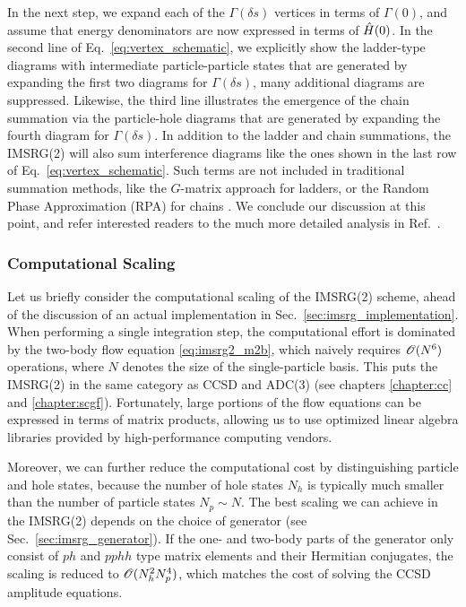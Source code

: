 {In the next step, we expand each of the $\Gamma(\delta s)$ vertices in
terms of $\Gamma(0)$, and assume that energy denominators are now
expressed in terms of $\hat{H}(0)$. In the second line of Eq.~\eqref{eq:vertex_schematic},
we explicitly show the ladder-type diagrams with intermediate 
particle-particle states that are generated by expanding
the first two diagrams for $\Gamma(\delta s)$, many additional diagrams
are suppressed. Likewise, the third line illustrates the emergence of 
the chain summation via the particle-hole diagrams that 
are generated by expanding the fourth diagram for $\Gamma(\delta s)$.
In addition to the ladder and chain summations, the IMSRG(2) will also
sum interference diagrams like the ones shown in the last row of 
Eq.~\eqref{eq:vertex_schematic}.
Such terms are not included in traditional summation methods, like
the $G$-matrix approach for ladders, or the Random Phase Approximation
(RPA) for chains \cite{Day:1967zl,Brandow:1967tg,Fetter:2003ve}. We
conclude our discussion at this point, and refer interested readers
to the much more detailed analysis in Ref.~\cite{Hergert:2016jk}.

%
%
\subsubsection{Computational Scaling}
Let us briefly consider the computational scaling of the IMSRG(2) scheme,
ahead of the discussion of an actual implementation in Sec.~\ref{sec:imsrg_implementation}.
When performing a single integration step, the computational effort is 
dominated by the two-body flow equation \eqref{eq:imsrg2_m2b}, which 
naively requires $\mathcal{O}(N^6)$ operations, where $N$ denotes the size of
the single-particle basis. This puts the IMSRG(2) in the same category 
as CCSD and ADC(3) (see chapters \ref{chapter:cc} and \ref{chapter:scgf}).
Fortunately, large portions of the flow equations can be expressed in 
terms of matrix products, allowing us to use optimized linear algebra 
libraries provided by high-performance computing vendors. 

Moreover, we can further reduce the computational cost by distinguishing 
particle and hole states, because the number of hole states $N_h$ is 
typically much smaller than the number of particle states $N_p\sim N$. 
The best scaling we can achieve in the IMSRG(2) depends on the choice of 
generator (see Sec.~\ref{sec:imsrg_generator}). If the one- and two-body 
parts of the 
generator only consist of $ph$ and $pphh$ type matrix elements and their 
Hermitian conjugates, the scaling is reduced to $\mathcal{O}(N_h^2N_p^4)$, 
which matches the cost of solving the CCSD amplitude equations.


}
